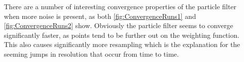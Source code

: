 There are a number of interesting convergence properties of the
particle filter when more noise is present, as both \autoref{fig:ConvergenceRuns1} and
\autoref{fig:ConvergenceRuns2} show. Obviously the particle filter seems to converge
significantly faster, as points tend to be further out on the weighting function. This
also causes significantly more resampling which is the explanation for the seeming
jumps in resolution that occur from time to time. 

\begin{figure}[H]
\\
\end{figure}
\begin{figure}[H]
\\
\end{figure}
